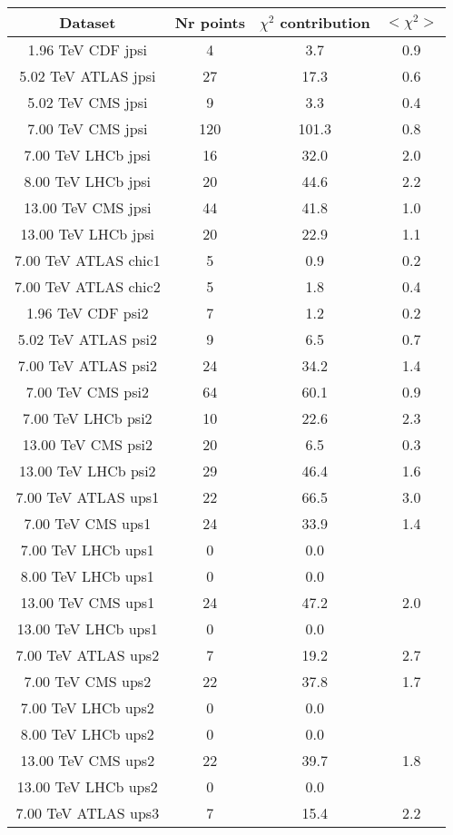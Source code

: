 \begin{table}[h!]
\centering
\begin{tabular}{c|c|c|c}
Dataset & Nr points & $\chi^2$ contribution & $<\chi^2>$ \\
\hline
1.96 TeV CDF jpsi & 4 & 3.7 & 0.9 \\
5.02 TeV ATLAS jpsi & 27 & 17.3 & 0.6 \\
5.02 TeV CMS jpsi & 9 & 3.3 & 0.4 \\
7.00 TeV CMS jpsi & 120 & 101.3 & 0.8 \\
7.00 TeV LHCb jpsi & 16 & 32.0 & 2.0 \\
8.00 TeV LHCb jpsi & 20 & 44.6 & 2.2 \\
13.00 TeV CMS jpsi & 44 & 41.8 & 1.0 \\
13.00 TeV LHCb jpsi & 20 & 22.9 & 1.1 \\
7.00 TeV ATLAS chic1 & 5 & 0.9 & 0.2 \\
7.00 TeV ATLAS chic2 & 5 & 1.8 & 0.4 \\
1.96 TeV CDF psi2 & 7 & 1.2 & 0.2 \\
5.02 TeV ATLAS psi2 & 9 & 6.5 & 0.7 \\
7.00 TeV ATLAS psi2 & 24 & 34.2 & 1.4 \\
7.00 TeV CMS psi2 & 64 & 60.1 & 0.9 \\
7.00 TeV LHCb psi2 & 10 & 22.6 & 2.3 \\
13.00 TeV CMS psi2 & 20 & 6.5 & 0.3 \\
13.00 TeV LHCb psi2 & 29 & 46.4 & 1.6 \\
7.00 TeV ATLAS ups1 & 22 & 66.5 & 3.0 \\
7.00 TeV CMS ups1 & 24 & 33.9 & 1.4 \\
7.00 TeV LHCb ups1 & 0 & 0.0 &  \\
8.00 TeV LHCb ups1 & 0 & 0.0 &  \\
13.00 TeV CMS ups1 & 24 & 47.2 & 2.0 \\
13.00 TeV LHCb ups1 & 0 & 0.0 &  \\
7.00 TeV ATLAS ups2 & 7 & 19.2 & 2.7 \\
7.00 TeV CMS ups2 & 22 & 37.8 & 1.7 \\
7.00 TeV LHCb ups2 & 0 & 0.0 &  \\
8.00 TeV LHCb ups2 & 0 & 0.0 &  \\
13.00 TeV CMS ups2 & 22 & 39.7 & 1.8 \\
13.00 TeV LHCb ups2 & 0 & 0.0 &  \\
7.00 TeV ATLAS ups3 & 7 & 15.4 & 2.2 \\

\end{tabular}
\end{table}
